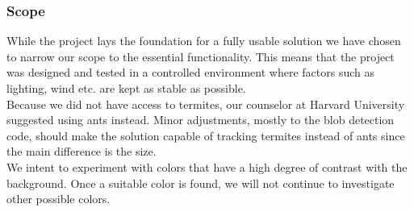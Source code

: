 

\subsubsection{Scope} \mbox{}\par



While the project lays the foundation for a fully usable solution we have chosen to narrow our scope to the essential functionality. This means that the project was designed and tested in a controlled environment where factors such as lighting, wind etc. are kept as stable as possible. \\

Because we did not have access to termites, our counselor at Harvard University suggested using ants instead. Minor adjustments, mostly to the blob detection code, should make the solution capable of tracking termites instead of ants since the main difference is the size. \\

We intent to experiment with colors that have a high degree of contrast with the background. Once a suitable color is found, we will not continue to investigate other possible colors.\\



